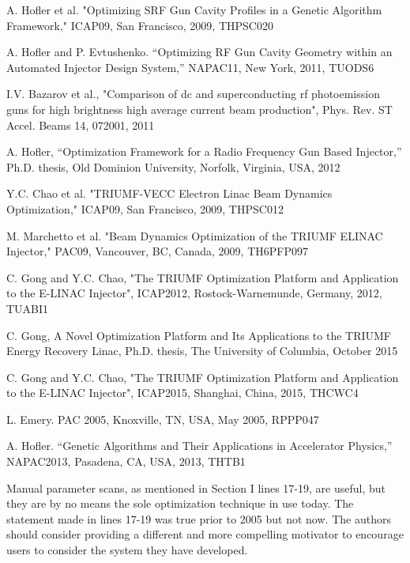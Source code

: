 \documentclass{article}
\begin{document}
A. Hofler et al. "Optimizing SRF Gun Cavity Profiles in a Genetic
Algorithm Framework," ICAP09, San Francisco, 2009, THPSC020 


A. Hofler and P. Evtushenko. “Optimizing RF Gun Cavity Geometry within
an Automated Injector Design System,” NAPAC11, New York, 2011, TUODS6

I.V. Bazarov et al., "Comparison of dc and superconducting rf
photoemission guns for high brightness high average current beam
production", Phys. Rev. ST Accel. Beams 14, 072001, 2011

A. Hofler, “Optimization Framework for a Radio Frequency Gun Based
Injector,” Ph.D. thesis, Old Dominion University, Norfolk, Virginia,
USA, 2012

{\color{blue}{Excluded because of similarity to other references or scope of paper:}}

Y.C. Chao et al. "TRIUMF-VECC Electron Linac Beam Dynamics
Optimization," ICAP09, San Francisco, 2009, THPSC012

M. Marchetto et al. "Beam Dynamics Optimization of the TRIUMF ELINAC
Injector," PAC09, Vancouver, BC, Canada, 2009, TH6PFP097

C. Gong and Y.C. Chao, "The TRIUMF Optimization Platform and
Application to the E-LINAC Injector", ICAP2012, Rostock-Warnemunde,
Germany, 2012, TUABI1

C. Gong, A Novel Optimization Platform and Its Applications to the
TRIUMF Energy Recovery Linac, Ph.D. thesis, The University of
Columbia, October 2015

C. Gong and Y.C. Chao, "The TRIUMF Optimization Platform and
Application to the E-LINAC Injector", ICAP2015, Shanghai, China, 2015,
THCWC4

L. Emery. PAC 2005, Knoxville, TN, USA, May 2005, RPPP047

A. Hofler. “Genetic Algorithms and Their Applications in
Accelerator Physics,” NAPAC2013, Pasadena, CA, USA, 2013, THTB1

\vspace{1em}

Manual parameter scans, as mentioned in Section I lines 17-19, are
useful, but they are by no means the sole optimization technique in
use today. The statement made in lines 17-19 was true prior to 2005
but not now. The authors should consider providing a different and
more compelling motivator to encourage users to consider the system
they have developed.
\end{document}
